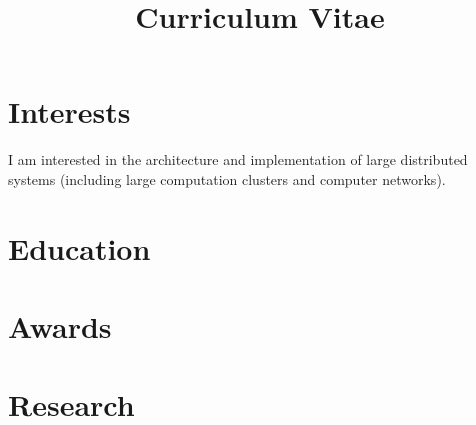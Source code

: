 \documentclass[11pt,letterpaper,sans]{moderncv}        %
\title{Curriculum Vitae}                               %
\newcommand\eat[1]{}
\begin{document}
\makecvtitle
\section{Interests}
I am interested in the architecture and implementation of large distributed systems (including large computation clusters and
computer networks). 

\section{Education}

\section{Awards}

\section{Research}
\eat{Network policy (for instance isolation policies implemented by firewalls or caching as done by web proxies) enforcement requires
a variety of middleboxes to act correctly in concert: for instance isolation policies require not just that firewalls be correctly configured but also require
that no previous middleboxes strip information required by the firewall. This project focuses on providing tools that given network topology and higher level
policies produce proofs that the policies are enforced or counterexamples where they are not.}

\eat{Network policies (from above) often depend on shared information (for instance the identity of the user associated with a particular
IP address). The CAP theorem indicates that in general distributed data stores must make a choice between consistency and availability in the presence of
failures (partitions). We investigate the implications of the CAP theorem on policy enforcement in SDN networks and also look at the weakest consistency model
required by a variety of network policies.}
\end{document}
